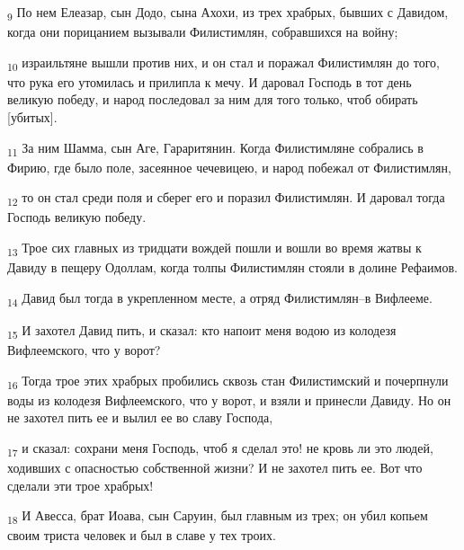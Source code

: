 \begin{tcolorbox}
\textsubscript{9} По нем Елеазар, сын Додо, сына Ахохи, из трех храбрых, бывших с Давидом, когда они порицанием вызывали Филистимлян, собравшихся на войну;
\end{tcolorbox}
\begin{tcolorbox}
\textsubscript{10} израильтяне вышли против них, и он стал и поражал Филистимлян до того, что рука его утомилась и прилипла к мечу. И даровал Господь в тот день великую победу, и народ последовал за ним для того только, чтоб обирать [убитых].
\end{tcolorbox}
\begin{tcolorbox}
\textsubscript{11} За ним Шамма, сын Аге, Гараритянин. Когда Филистимляне собрались в Фирию, где было поле, засеянное чечевицею, и народ побежал от Филистимлян,
\end{tcolorbox}
\begin{tcolorbox}
\textsubscript{12} то он стал среди поля и сберег его и поразил Филистимлян. И даровал тогда Господь великую победу.
\end{tcolorbox}
\begin{tcolorbox}
\textsubscript{13} Трое сих главных из тридцати вождей пошли и вошли во время жатвы к Давиду в пещеру Одоллам, когда толпы Филистимлян стояли в долине Рефаимов.
\end{tcolorbox}
\begin{tcolorbox}
\textsubscript{14} Давид был тогда в укрепленном месте, а отряд Филистимлян--в Вифлееме.
\end{tcolorbox}
\begin{tcolorbox}
\textsubscript{15} И захотел Давид пить, и сказал: кто напоит меня водою из колодезя Вифлеемского, что у ворот?
\end{tcolorbox}
\begin{tcolorbox}
\textsubscript{16} Тогда трое этих храбрых пробились сквозь стан Филистимский и почерпнули воды из колодезя Вифлеемского, что у ворот, и взяли и принесли Давиду. Но он не захотел пить ее и вылил ее во славу Господа,
\end{tcolorbox}
\begin{tcolorbox}
\textsubscript{17} и сказал: сохрани меня Господь, чтоб я сделал это! не кровь ли это людей, ходивших с опасностью собственной жизни? И не захотел пить ее. Вот что сделали эти трое храбрых!
\end{tcolorbox}
\begin{tcolorbox}
\textsubscript{18} И Авесса, брат Иоава, сын Саруин, был главным из трех; он убил копьем своим триста человек и был в славе у тех троих.
\end{tcolorbox}
